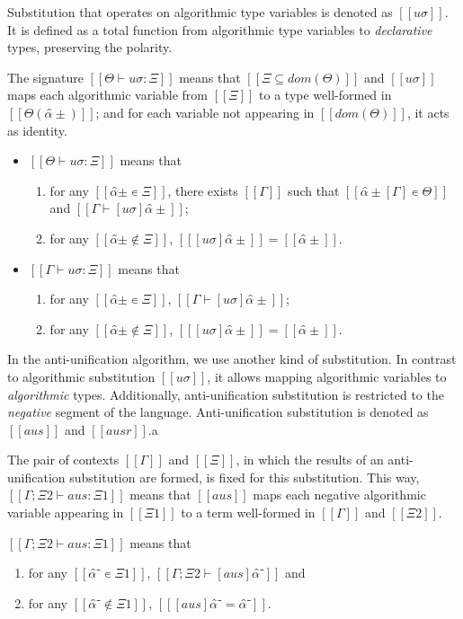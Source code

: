 \documentclass[a4,natbib=false]{article}
\begin{document}
Substitution that operates on algorithmic type variables is denoted as
$[[uσ]]$. It is defined as a total function from algorithmic 
type variables to \emph{declarative} types, preserving the polarity.

The signature $[[Θ ⊢ uσ : Ξ]]$ means that
$[[Ξ ⊆ dom(Θ)]]$ and 
$[[uσ]]$ maps each algorithmic variable 
from $[[Ξ]]$ to a type well-formed in $[[Θ(α̂±)]]$;
and for each variable not appearing in $[[dom(Θ)]]$, 
it acts as identity.

\begin{definition}
  \label{def:algo-subst-sig}
  \hfill
  \begin{itemize}
    \item $[[Θ ⊢ uσ : Ξ]]$ means that
      \begin{enumerate}
        \item for any $[[α̂± ∊ Ξ]]$,
          there exists $[[Γ]]$ such that $[[ α̂±[Γ] ∊ Θ ]]$
          and $[[ Γ ⊢ [uσ]α̂± ]]$; 
        \item for any $[[ α̂± ∉ Ξ]]$, $[[ [uσ]α̂± ]] =  [[ α̂± ]]$.
      \end{enumerate}
    \item $[[Γ ⊢ uσ : Ξ]]$ means that
      \begin{enumerate}
        \item for any $[[α̂± ∊ Ξ]]$, $[[ Γ ⊢ [uσ]α̂± ]]$; 
        \item for any $[[ α̂± ∉ Ξ]]$, $[[ [uσ]α̂± ]] =  [[ α̂± ]]$.
      \end{enumerate}
  \end{itemize}
\end{definition}

In the anti-unification algorithm, we use another kind of substitution.
In contrast to algorithmic substitution $[[uσ]]$,
it allows mapping algorithmic variables to
\emph{algorithmic} types.
Additionally, anti-unification substitution is restricted to the
\emph{negative} segment of the language.
Anti-unification substitution is denoted as $[[aus]]$ and $[[ausr]]$.a

The pair of contexts $[[Γ]]$ and $[[Ξ]]$,
in which the results of an anti-unification substitution 
are formed, is fixed for this substitution.
This way, $[[Γ; Ξ2 ⊢ aus : Ξ1]]$ means that $[[aus]]$ maps each negative algorithmic
variable appearing in $[[Ξ1]]$ to a term well-formed in $[[Γ]]$ and $[[Ξ2]]$.

\begin{definition}
  $[[Γ; Ξ2 ⊢ aus : Ξ1]]$ means that
  \begin{enumerate}
    \item for any $[[ α̂⁻ ∊ Ξ1]]$, $[[ Γ; Ξ2 ⊢ [aus]α̂⁻ ]]$ and
    \item for any $[[ α̂⁻ ∉ Ξ1]]$, $[[ [aus]α̂⁻ = α̂⁻ ]]$.
  \end{enumerate}
\end{definition}
\end{document}
